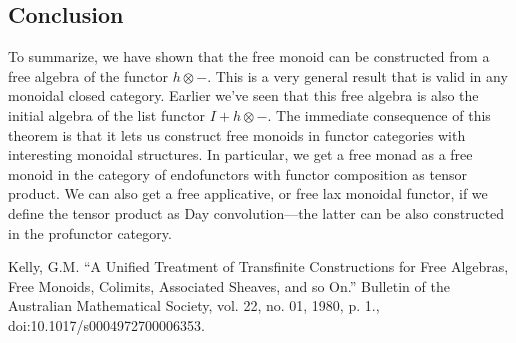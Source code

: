 \documentclass[letterpaper, 10 pt, conference]{ieeeconf}
\begin{document}
\subsection{Conclusion}

To summarize, we have shown that the free monoid can be constructed from a free algebra of the functor $h \otimes -$. This is a very general result that is valid in any monoidal closed category. Earlier we've seen that this free algebra is also the initial algebra of the list functor $I + h \otimes -$. The immediate consequence of this theorem is that it lets us construct free monoids in functor categories with interesting monoidal structures. In particular, we get a free monad as a free monoid in the category of endofunctors with functor composition as tensor product. We can also get a free applicative, or free lax monoidal functor, if we define the tensor product as Day convolution---the latter can be also constructed in the profunctor category. 


\begin{thebibliography}{99}
 Kelly, G.M. “A Unified Treatment of Transfinite Constructions for Free Algebras, Free Monoids, Colimits, Associated Sheaves, and so On.” Bulletin of the Australian Mathematical Society, vol. 22, no. 01, 1980, p. 1., doi:10.1017/s0004972700006353.
\end{thebibliography}

 
\end{document}
